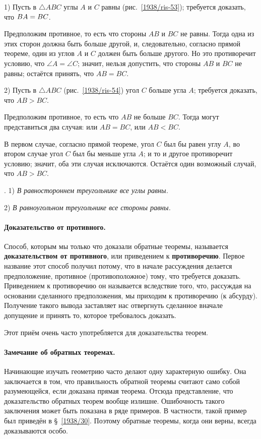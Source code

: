 \documentclass[twoside]{book}
\makeatletter
\newcommand{\rindex}[2][\imki@jobname]{%
  \index[#1]{\detokenize{#2}}%
}
\makeatother
\begin{document}
1) Пусть в $\triangle ABC$ углы $A$ и $C$ равны (рис.~\ref{1938/ris-53});
требуется доказать, что $BA \z= BC$.

Предположим противное, то есть что стороны $AB$ и $BC$ не равны.
Тогда одна из этих сторон должна быть больше другой, и, следовательно, согласно прямой теореме, один из углов $A$ и $C$ должен быть больше другого.
Но это противоречит условию, что $\angle A = \angle C$;
значит, нельзя допустить, что стороны $AB$ и $BC$ не равны;
остаётся принять, что $AB=BC$.

2) Пусть в $\triangle ABC$ (рис.~\ref{1938/ris-54})
угол $C$ больше угла $A$;
требуется доказать, что $AB > BC$.

Предположим противное, то есть что $AB$ не больше $BC$.
Тогда могут представиться два случая:
или $AB=BC$, или $AB<BC$.

В первом случае, согласно прямой теореме, угол $C$ был бы равен углу $A$, во втором случае угол $C$ был бы меньше угла $A$;
и то и другое противоречит условию;
значит, оба эти случая исключаются.
Остаётся один возможный случай, что $AB>BC$.

\smallskip
\mbox{.}
1) \emph{В равностороннем треугольнике все углы равны.}

2) \emph{В равноугольном треугольнике все стороны равны.}

\paragraph{Доказательство от противного.}\label{1938/48}
Способ, которым мы только что доказали обратные теоремы, называется \rindex{доказательство от противного}\textbf{доказательством от противного}, или приведением к \rindex{противоречие}\textbf{противоречию}.
Первое название этот способ получил потому, что в начале рассуждения делается предположение, противное (противоположное) тому, что требуется доказать.
Приведением к противоречию он называется вследствие того, что, рассуждая на основании сделанного предположения, мы приходим к противоречию (к абсурду).
Получение такого вывода заставляет нас отвергнуть сделанное вначале допущение и принять то, которое требовалось доказать.

Этот приём очень часто употребляется для доказательства теорем.

\paragraph{Замечание об обратных теоремах.}\label{1938/49}
Начинающие изучать геометрию часто делают одну характерную ошибку.
Она заключается в том, что правильность обратной теоремы считают само собой разумеющейся, если доказана прямая теорема.
Отсюда представление, что доказательство обратных теорем вообще излишне.
Ошибочность такого заключения может быть показана в ряде примеров.
В частности, такой пример был приведён в §~\ref{1938/30}.
Поэтому обратные теоремы, когда они верны, всегда доказываются особо.
\end{document}
